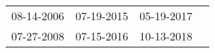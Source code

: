 \begin{supertabular}{llll}
 08-14-2006 &  07-19-2015 &  05-19-2017 \\
 07-27-2008 &  07-15-2016 &  10-13-2018 \\
\end{supertabular}
